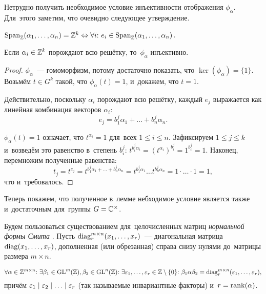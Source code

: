 \documentclass{article}
\begin{document}
Нетрудно получить необходимое условие инъективности отображения $\phi_\alpha$.
Для~этого заметим, что очевидно следующее утверждение.

\begin{statement*}
    $\mathrm{Span}_{\mathbb{Z}}(\alpha_1, \ldots, \alpha_n) = \mathbb{Z}^k \Leftrightarrow \forall i{:}\ e_i \in \mathrm{Span}_{\mathbb{Z}}(\alpha_1, \ldots, \alpha_n)$.
\end{statement*}

\begin{lemma}
    Если $\alpha_i \in \mathbb{Z}^k$ порождают всю решётку, то~$\phi_\alpha$ инъективно.
\end{lemma}

\begin{proof}
    $\phi_\alpha$~— гомоморфизм, потому достаточно показать, что $\ker(\phi_\alpha) = \{1\}$.
    Возьмём $t \in G^k$ такой, что $\phi_\alpha(t) = 1$, и~докажем, что $t = 1$.

    Действительно, поскольку $\alpha_i$ порождают всю решётку, каждый $e_j$ выражается как линейная комбинация векторов $\alpha_i$:
    $$
        e_j = b^j_1 \alpha_1 + \ldots + b^j_n \alpha_n.
    $$

    $\phi_\alpha(t) = 1$ означает, что $t^{\alpha_i} = 1$ для~всех $1 \leq i \leq n$.
    Зафиксируем $1 \leq j \leq k$ и~возведём это равенство в~степень $b^j_i$: $t^{b^j_i \alpha_i} = (t^{\alpha_i})^{b^j_i} = 1^{b^j_i} = 1$.
    Наконец, перемножим полученные равенства:
    $$
        t_j = t^{e_j} = t^{b^j_1 \alpha_1 + \ldots + b^j_n \alpha_n} = t^{b^j_1 \alpha_1} \ldots t^{b^j_n \alpha_n} = 1 \cdot \ldots \cdot 1 = 1,
    $$
    что и~требовалось.
\end{proof}

Теперь покажем, что полученное в~лемме небходимое условие является также и~достаточным для~группы $G = \mathbb{C}^\times$.

Будем пользоваться существованием для~целочисленных матриц \textit{нормальной формы Смита} \cite{Smth60}.
Пусть $\mathrm{diag}^{m \times n}_r(x_1, \ldots, x_r)$~— диагональная матрица $\mathrm{diag}(x_1, \ldots, x_r)$,
дополненная (или обрезанная) справа снизу нулями до~матрицы размера $m \times n$.

\begin{theorem*}
    $$
        \forall \alpha \in \mathbb{Z}^{m \times n}{:}\
        \exists \beta_1 \in \mathrm{GL}^m(\mathbb{Z}), \beta_2 \in \mathrm{GL}^n(\mathbb{Z}){:} \
        \exists \varepsilon_1, \ldots, \varepsilon_r \in \mathbb{Z} \setminus \{0\}{:} \
        \beta_1 \alpha \beta_2 = \mathrm{diag}^{m \times n}_r(\varepsilon_1, \ldots, \varepsilon_r),
    $$
    причём $\varepsilon_1 \mid \varepsilon_2 \mid \ldots \mid \varepsilon_r$ (так называемые инвариантные факторы) и~$r = \mathrm{rank}(\alpha)$.
\end{theorem*}
\end{document}
